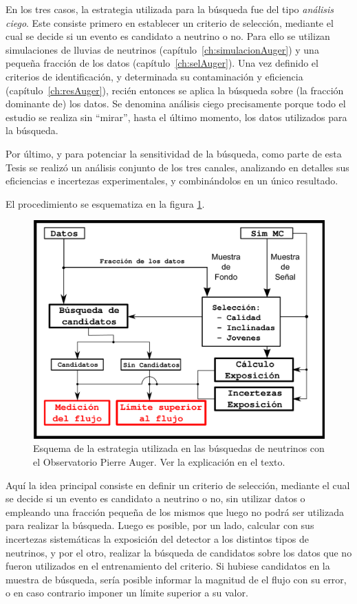 En los tres casos, la estrategia utilizada para la búsqueda fue del tipo \emph{análisis ciego}. Este consiste primero en establecer un criterio de selección, mediante el cual se decide si un evento es candidato a neutrino o no. Para ello se utilizan simulaciones de lluvias de neutrinos (capítulo~\ref{ch:simulacionAuger}) y una pequeña fracción de los datos (capítulo~\ref{ch:selAuger}). Una vez definido el criterios de identificación, y determinada su contaminación y eficiencia (capítulo~\ref{ch:resAuger}), recién entonces se aplica la búsqueda sobre (la fracción dominante de) los datos.
Se denomina análisis ciego precisamente porque todo el estudio se realiza sin ``mirar'', hasta el último momento, los datos utilizados para la búsqueda.

Por último, y para potenciar la sensitividad de la búsqueda, como parte de esta Tesis se realizó un análisis conjunto de los tres canales, analizando en detalles sus eficiencias e incertezas experimentales, y combinándolos en un único resultado.


El procedimiento se esquematiza en la figura \ref{fig:strAuger}. 
%
\begin{figure}[ht!]
	\centering
	\includegraphics[width=\textwidth]{./fig/estrategiaAuger/analysisSchema}
	\caption{\label{fig:strAuger}
	Esquema de la estrategia utilizada en las búsquedas de neutrinos con el Observatorio Pierre Auger. Ver la explicación en el texto.
	}
\end{figure}
%
Aqu\'i la idea principal consiste en definir un criterio de selección, mediante el cual se decide si un evento es candidato a neutrino o no, sin utilizar datos o empleando una fracción peque\~na de los mismos que luego no podrá ser utilizada para realizar la búsqueda.
Luego es posible, por un lado, calcular con sus incertezas sistemáticas la exposición del detector a los distintos tipos de neutrinos, y por el otro, realizar la búsqueda de candidatos sobre los datos que no fueron utilizados en el entrenamiento del criterio.
Si hubiese candidatos en la muestra de b\'usqueda, sería posible informar la magnitud de el flujo con su error, o en caso contrario imponer un l\'imite superior a su valor.

